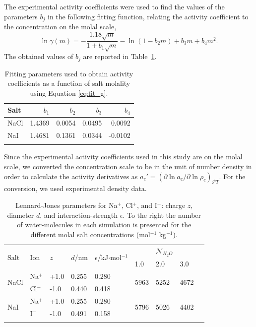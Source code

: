 \documentclass[
journal=jctcce,
manuscript=letter]{achemso}
\begin{document}
The experimental activity coefficients\cite{Robinson1959} were used to find the values of the parameters $b_j$ in the following fitting function\cite{Gee2011}, relating the activity coefficient to the concentration on the molal scale,
\begin{equation}
\ln \gamma(m) = -\frac{1.18\sqrt{m}}{1+b_1\sqrt{m}} - \ln(1-b_2 m) + b_3 m + b_4 m^2.
\label{eq:fit_g}
\end{equation}
The obtained values of $b_j$ are reported in Table~\ref{tab:S1}.

\begin{table}[ht]
\caption{Fitting parameters used to obtain activity coefficients as a function of salt molality using Equation \ref{eq:fit_g}.}
\begin{tabular}{lrrrr}\hline
          Salt & $b_1$ & $b_2$ & $b_3$ & $b_4$ \\\hline
NaCl   & 1.4369 & 0.0054 & 0.0495 & 0.0092 \\
NaI    & 1.4681 & 0.1361 & 0.0344 &-0.0102 \\
\hline
\label{tab:S1}
\end{tabular}
\end{table}
Since the experimental activity coefficients used in this study are on the molal scale, we converted the concentration scale to be in the unit of number density in order to calculate the activity derivatives as $a_{c}'=\left ( \partial \ln a_c / \partial \ln \rho_c \right )_{\mathcal{P}T}$. For the conversion, we used experimental density data\cite{Zaytsev1992,Lalibert2004}.

\begin{table}[ht]
\caption{Lennard-Jones parameters for Na$^{+}$, Cl$^{+}$, and I$^{-}$: charge $z$, diameter $d$, and interaction-strength $\epsilon$. To the right the number of water-molecules in each simulation is presented for the different molal salt concentrations (mol$^{-1}$ kg$^{-1}$).}
\begin{tabular}{lllllllll}\hline
\multirow{2}{*}{Salt} & \multirow{2}{*}{Ion} & \multirow{2}{*}{$z$} & \multirow{2}{*}{$d$/nm} & \multirow{2}{*}{$\epsilon$/kJ$\cdot$mol$^{-1}$} & & $\mathcal{N}_{H_2O}$ & & \\  & & & & & 1.0 & 2.0 & 3.0 & \\\hline
\multirow{2}{*}{NaCl} & Na$^+$ & +1.0 & 0.255 & 0.280 & \multirow{2}{*}{5963} & \multirow{2}{*}{5252} & \multirow{2}{*}{4672} \\
& Cl$^-$ & -1.0 & 0.440 & 0.418 &  & & \\
\multirow{2}{*}{NaI} & Na$^+$ & +1.0 & 0.255 & 0.280 & \multirow{2}{*}{5796} & \multirow{2}{*}{5026} & \multirow{2}{*}{4402}  \\ 
& I$^-$ & -1.0 & 0.491 & 0.158 &  & & \\\hline
\label{tab:S2}
\end{tabular}
\end{table}


\end{document}
